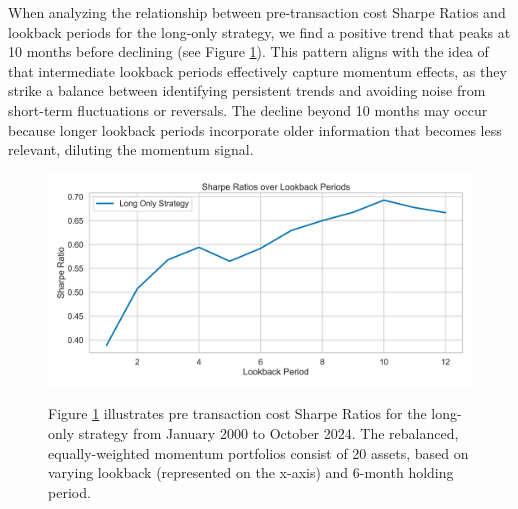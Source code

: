 \documentclass[a4paper,12pt]{article}
\begin{document}
When analyzing the relationship between pre-transaction cost Sharpe Ratios and lookback periods for the long-only strategy, we find a positive trend that peaks at 10 months before declining (see Figure \ref{fig_03}). This pattern aligns with the idea of \cite{jegatit1993} that intermediate lookback periods effectively capture momentum effects, as they strike a balance between identifying persistent trends and avoiding noise from short-term fluctuations or reversals. The decline beyond 10 months may occur because longer lookback periods incorporate older information that becomes less relevant, diluting the momentum signal.

\begin{figure}[htbp]
\centerline{\includegraphics[width=1\textwidth]{figures/rc_lookback_period.png}}
\caption{}
\label{fig_03}
\small{{Figure \ref{fig_03} illustrates pre transaction cost Sharpe Ratios for the long-only strategy from January 2000 to October 2024. The rebalanced, equally-weighted momentum portfolios consist of 20 assets, based on varying lookback (represented on the x-axis) and 6-month  holding period.}}
\end{figure}
\end{document}
